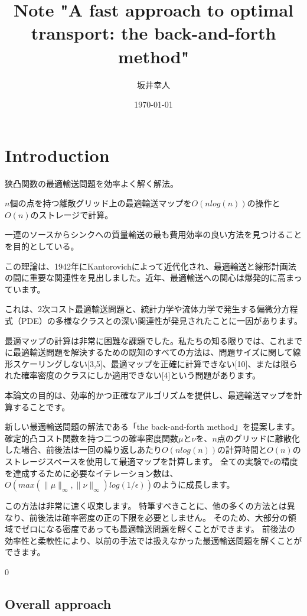 \documentclass{jsarticle}
\title{Note  "A fast approach to optimal transport: the back-and-forth method"}
\author{坂井幸人}
\date{\today}
\theoremstyle{definition}
\begin{document}
\maketitle

\section{Introduction}
狭凸関数の最適輸送問題を効率よく解く解法。

$n$個の点を持つ離散グリッド上の最適輸送マップを$O(n log(n))$の操作と$O(n)$のストレージで計算。

一連のソースからシンクへの質量輸送の最も費用効率の良い方法を見つけることを目的としている。

この理論は、1942年にKantorovichによって近代化され、最適輸送と線形計画法の間に重要な関連性を見出しました。近年、最適輸送への関心は爆発的に高まっています。

これは、2次コスト最適輸送問題と、統計力学や流体力学で発生する偏微分方程式（PDE）の多様なクラスとの深い関連性が発見されたことに一因があります。

最適マップの計算は非常に困難な課題でした。私たちの知る限りでは、これまでに最適輸送問題を解決するための既知のすべての方法は、問題サイズに関して線形スケーリングしない[3,5]、最適マップを正確に計算できない[10]、または限られた確率密度のクラスにしか適用できない[4]という問題があります。\par
\vspace\baselineskip 

本論文の目的は、効率的かつ正確なアルゴリズムを提供し、最適輸送マップを計算することです。

新しい最適輸送問題の解法である「the back-and-forth method」を提案します。
確定的凸コスト関数を持つ二つの確率密度関数$\mu$と$\nu$を、$n$点のグリッドに離散化した場合、前後法は一回の繰り返しあたり$O(n log(n))$の計算時間と$O(n)$のストレージスペースを使用して最適マップを計算します。
全ての実験で$\epsilon$の精度を達成するために必要なイテレーション数は、$O(max( \|\mu\|_\infty, \|\nu\|_\infty) log(1/\epsilon))$のように成長します。

この方法は非常に速く収束します。
\color{red}
特筆すべきことに、他の多くの方法とは異なり、前後法は確率密度の正の下限を必要としません。
そのため、大部分の領域でゼロになる密度であっても最適輸送問題を解くことができます。
前後法の効率性と柔軟性により、以前の手法では扱えなかった最適輸送問題を解くことができます。

\color{black}0


\subsection{Overall approach}
\end{document}
